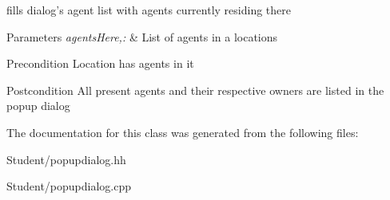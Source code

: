 fills dialog's agent list with agents currently residing there 


\begin{DoxyParams}{Parameters}
{\em agents\-Here,\-:} & List of agents in a locations \\
\hline
\end{DoxyParams}
\begin{DoxyPrecond}{Precondition}
Location has agents in it 
\end{DoxyPrecond}
\begin{DoxyPostcond}{Postcondition}
All present agents and their respective owners are listed in the popup dialog 
\end{DoxyPostcond}


The documentation for this class was generated from the following files\-:\begin{DoxyCompactItemize}
\item 
Student/popupdialog.\-hh\item 
Student/popupdialog.\-cpp\end{DoxyCompactItemize}
